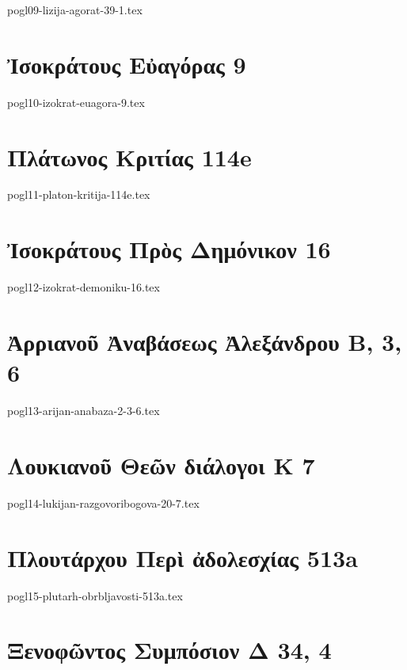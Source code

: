 \documentclass[a4paper,12pt,twoside]{report}
\begin{document}
{pogl09-lizija-agorat-39-1.tex}

\chapter[Ἰσοκράτους Εὐαγόρας]{\textgreek[variant=ancient]{Ἰσοκράτους Εὐαγόρας} 9}

{pogl10-izokrat-euagora-9.tex}

\chapter[Πλάτωνος Κριτίας]{\textgreek[variant=ancient]{Πλάτωνος Κριτίας} 114e}

{pogl11-platon-kritija-114e.tex}

\chapter[Ἰσοκράτους Πρὸς Δημόνικον]{\textgreek[variant=ancient]{Ἰσοκράτους Πρὸς Δημόνικον} 16}

{pogl12-izokrat-demoniku-16.tex}

\chapter[Ἀρριανοῦ Ἀναβάσεως Ἀλεξάνδρου Β]{\textgreek[variant=ancient]{Ἀρριανοῦ Ἀναβάσεως Ἀλεξάνδρου Β,} 3, 6}

{pogl13-arijan-anabaza-2-3-6.tex}

\chapter[Λουκιανοῦ Θεῶν διάλογοι]{\textgreek[variant=ancient]{Λουκιανοῦ Θεῶν διάλογοι Κ} 7}

{pogl14-lukijan-razgovoribogova-20-7.tex}

\chapter[Πλουτάρχου Περὶ ἀδολεσχίας]{\textgreek[variant=ancient]{Πλουτάρχου Περὶ ἀδολεσχίας} 513a}

{pogl15-plutarh-obrbljavosti-513a.tex}

\chapter[Ξενοφῶντος Συμπόσιον Δ]{\textgreek[variant=ancient]{Ξενοφῶντος Συμπόσιον Δ} 34, 4}
\end{document}
